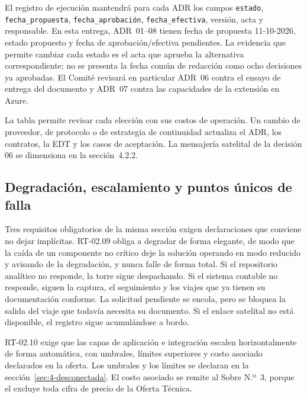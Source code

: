 
El registro de ejecución mantendrá para cada ADR los campos \texttt{estado}, \texttt{fecha\_propuesta}, \texttt{fecha\_aprobación}, \texttt{fecha\_efectiva}, versión, acta y responsable. En esta entrega, ADR~01–08 tienen fecha de propuesta 11-10-2026, estado propuesto y fecha de aprobación/efectiva pendientes. La evidencia que permite cambiar cada estado es el acta que aprueba la alternativa correspondiente; no se presenta la fecha común de redacción como ocho decisiones ya aprobadas. El Comité revisará en particular ADR~06 contra el ensayo de entrega del documento y ADR~07 contra las capacidades de la extensión en Azure.

La tabla permite revisar cada elección con sus costos de operación. Un cambio de proveedor, de protocolo o de estrategia de continuidad actualiza el ADR, los
contratos, la EDT y los casos de aceptación. La mensajería satelital de la decisión 06 se dimensiona
en la sección~4.2.2.

\subsection{Degradación, escalamiento y puntos únicos de falla}\label{sec:4-degradacion}

Tres requisitos obligatorios de la misma sección exigen declaraciones que conviene no dejar
implícitas. RT-02.09 obliga a degradar de forma elegante, de modo que la caída de un componente no
crítico deje la solución operando en modo reducido y avisando de la degradación, y nunca falle de
forma total. Si el repositorio analítico no responde, la torre sigue despachando. Si el sistema contable
no responde, siguen la captura, el seguimiento y los viajes que ya tienen su documentación conforme. La
solicitud pendiente se encola, pero se bloquea la salida del viaje que todavía necesita su documento. Si
el enlace satelital no está disponible, el registro sigue acumulándose a bordo.

RT-02.10 exige que las capas de aplicación e integración escalen horizontalmente de forma automática,
con umbrales, límites superiores y costo asociado declarados en la oferta. Los umbrales y los límites
se declaran en la sección~\ref{sec:4-desconectada}. El costo asociado se remite al Sobre N.º~3, porque
el  excluye toda cifra de precio de la Oferta Técnica.

